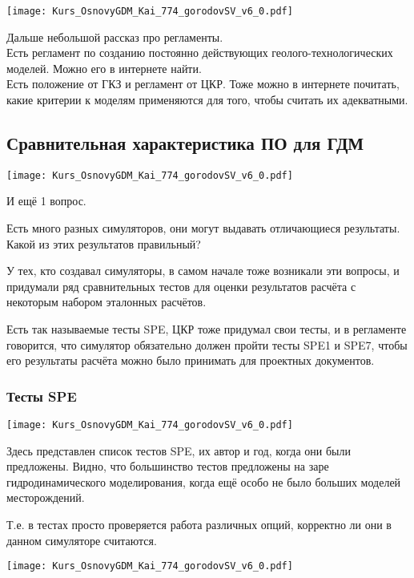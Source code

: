 \documentclass[main.tex]{subfiles}
\begin{document}
\texttt{[image: Kurs\_OsnovyGDM\_Kai\_774\_gorodovSV\_v6\_0.pdf]}

Дальше небольшой рассказ про регламенты.
\\

Есть регламент по созданию постоянно действующих геолого-технологических моделей.
Можно его в интернете найти.
\\

Есть положение от ГКЗ и регламент от ЦКР.
Тоже можно в интернете почитать, какие критерии к моделям применяются для того, чтобы считать их адекватными.

\subsection{Сравнительная характеристика ПО для ГДМ}

\texttt{[image: Kurs\_OsnovyGDM\_Kai\_774\_gorodovSV\_v6\_0.pdf]}

И ещё 1 вопрос.

Есть много разных симуляторов, они могут выдавать отличающиеся результаты.
Какой из этих результатов правильный?

У тех, кто создавал симуляторы, в самом начале тоже возникали эти вопросы, и придумали ряд сравнительных тестов для оценки результатов расчёта с некоторым набором эталонных расчётов.

Есть так называемые тесты SPE, ЦКР тоже придумал свои тесты, и в регламенте говорится, что симулятор обязательно должен пройти тесты SPE1 и SPE7, чтобы его результаты расчёта можно было принимать для проектных документов.

\subsubsection{Тесты SPE}

\texttt{[image: Kurs\_OsnovyGDM\_Kai\_774\_gorodovSV\_v6\_0.pdf]}

Здесь представлен список тестов SPE, их автор и год, когда они были предложены.
Видно, что большинство тестов предложены на заре гидродинамического моделирования, когда ещё особо не было больших моделей месторождений.

Т.е. в тестах просто проверяется работа различных опций, корректно ли они в данном симуляторе считаются.

\texttt{[image: Kurs\_OsnovyGDM\_Kai\_774\_gorodovSV\_v6\_0.pdf]}
\end{document}
